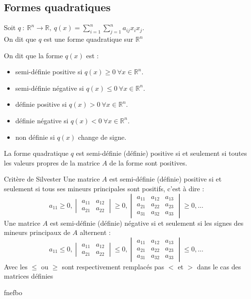 \subsection{Formes quadratiques}
\begin{defi}
Soit $q\ :\ \mathbb{R}^n\to\mathbb{R},\ q(x)=\sum_{i=1}^n\sum_{j=1}^n a_{ij}x_i x_j$.\\
On dit que $q$ est une forme quadratique sur $\mathbb{R}^n$
\end{defi}
\begin{defi}
On dit que la forme $q(x)$ est :
\begin{itemize}
    \item semi-définie positive si $q(x)\ge 0\ \forall x\in\mathbb{R}^n$.
    \item semi-définie négative si $q(x)\leq 0\ \forall x\in\mathbb{R}^n$.
    \item définie positive si $q(x)> 0\ \forall x\in\mathbb{R}^n$.
    \item définie négative si $q(x)< 0\ \forall x\in\mathbb{R}^n$.
    \item non définie si $q(x)$ change de signe.
\end{itemize}
\end{defi}
\begin{thm}[Proposition]
La forme quadratique $q$ est semi-définie (définie) positive si et seulement si toutes les valeurs propres de la matrice $A$ de la forme sont positives.
\end{thm}
\begin{bclogo}[couleur=green!30,couleurBord=green,logo=\bccle ,ombre=true,arrondi=0.1]{Critère de Silvester}
Une matrice $A$ est semi-définie (définie) positive si et seulement si tous ses mineurs principales sont positifs, c'est à  dire :
$$a_{11}\ge 0, \begin{vmatrix} a_{11}&a_{12}\\ a_{21} & a_{22}\end{vmatrix}\ge 0,\begin{vmatrix}a_{11} & a_{12} & a_{13}\\ a_{21} & a_{22} & a_{23}\\ a_{31} & a_{32} & a_{33}\end{vmatrix}\ge 0, ...$$
Une matrice $A$ est semi-définie (définie) négative si et seulement si les signes des mineurs principaux de $A$ alternent :
$$a_{11}\leq 0, \begin{vmatrix} a_{11}&a_{12}\\ a_{21} & a_{22}\end{vmatrix}\leq 0,\begin{vmatrix}a_{11} & a_{12} & a_{13}\\ a_{21} & a_{22} & a_{23}\\ a_{31} & a_{32} & a_{33}\end{vmatrix}\leq 0, ...$$
Avec les $\leq$ ou $\ge$ sont respectivement remplacés pas $<$ et $>$ dans le cas des matrices définies
\end{bclogo}
\begin{ex}
fnefbo
\end{ex}